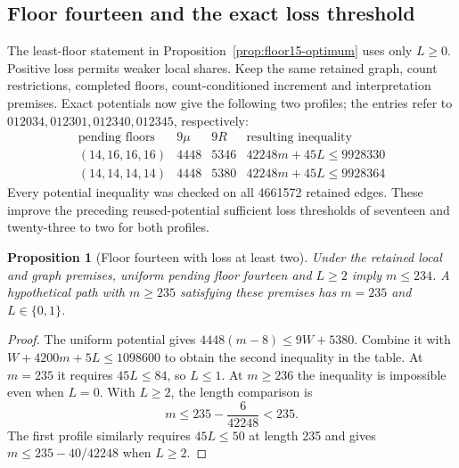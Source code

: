 \documentclass[11pt,a4paper]{article}
\newtheorem{proposition}[theorem]{Proposition}
\theoremstyle{definition}
\theoremstyle{remark}
\begin{document}
\subsection{Floor fourteen and the exact loss threshold}
\label{sec:floor14-loss}
The least-floor statement in Proposition~\ref{prop:floor15-optimum}
uses only $L\ge0$. Positive loss permits weaker local shares.
Keep the same retained graph, count restrictions, completed floors,
count-conditioned increment and interpretation premises. Exact potentials
now give the following two profiles; the entries refer to
$012034,012301,012340,012345$, respectively:
\[
\begin{array}{c|c|c|c}
\text{pending floors}&9\mu&9R&\text{resulting inequality}\\\hline
(14,16,16,16)&4448&5346&42248m+45L\le9928330\\
(14,14,14,14)&4448&5380&42248m+45L\le9928364
\end{array}
\]
Every potential inequality was checked on all 4661572 retained edges.
These improve the preceding reused-potential sufficient loss thresholds
of seventeen and twenty-three to two for both profiles.

\begin{proposition}[Floor fourteen with loss at least two]
Under the retained local and graph premises, uniform pending floor
fourteen and $L\ge2$ imply $m\le234$. A hypothetical path with
$m\ge235$ satisfying these premises has $m=235$ and $L\in\{0,1\}$.
\end{proposition}
\begin{proof}
The uniform potential gives $4448(m-8)\le9W+5380$.
Combine it with $W+4200m+5L\le1098600$ to obtain the second
inequality in the table. At $m=235$ it requires $45L\le84$,
so $L\le1$. At $m\ge236$ the inequality is impossible even when
$L=0$. With $L\ge2$, the length comparison is
\[
m\le235-\frac6{42248}<235.
\]
The first profile similarly requires $45L\le50$ at length 235 and
gives $m\le235-40/42248$ when $L\ge2$.
\end{proof}
\end{document}
